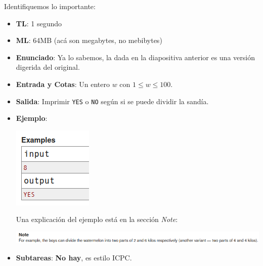 \documentclass{beamer}
\begin{document}
    \begin{frame}[noframenumbering]
        Identifiquemos lo importante: \pause
        \begin{itemize}
            \item \textbf{TL}: 1 segundo \pause
            \item \textbf{ML}: 64MB (acá son megabytes, no mebibytes) \pause
            \item \textbf{Enunciado}: Ya lo sabemos, la dada en la diapositiva anterior es una versión digerida del original. \pause
            \item \textbf{Entrada y Cotas}: Un entero $w$ con $1 \leq w \leq 100$. \pause
            \item \textbf{Salida}: Imprimir \texttt{YES} o \texttt{NO} según si se puede dividir la sandía. \pause
            \item \textbf{Ejemplo}: 
                \begin{center}
                    \includegraphics[height=.2\textheight]{./cf_example.png}
                \end{center} \pause
                Una explicación del ejemplo está en la sección \textit{Note}:

                \begin{center}
                    \includegraphics[width=.9\linewidth]{./cf_note.png}
                \end{center} \pause
            \item \textbf{Subtareas}: \textbf{No hay}, es estilo ICPC.
        \end{itemize}
    \end{frame}
\end{document}
